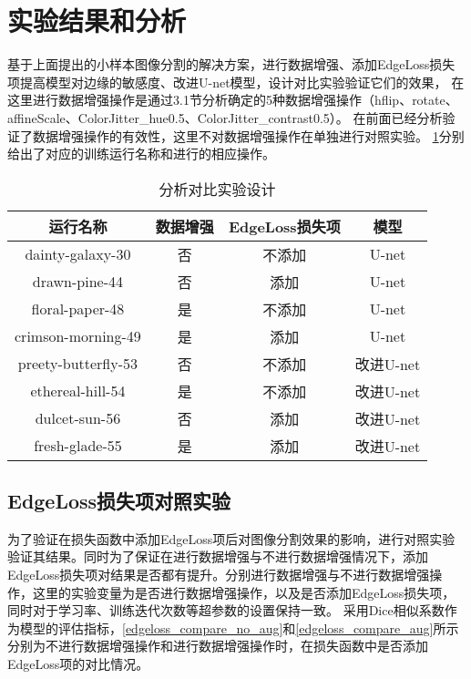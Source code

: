 \documentclass[AutoFakeBold]{LZUThesis}
\begin{document}
\section{实验结果和分析}
基于上面提出的小样本图像分割的解决方案，进行数据增强、添加EdgeLoss损失项提高模型对边缘的敏感度、改进U-net模型，设计对比实验验证它们的效果，
在这里进行数据增强操作是通过3.1节分析确定的5种数据增强操作（hflip、rotate、affineScale、ColorJitter\_hue0.5、ColorJitter\_contrast0.5）。
在前面已经分析验证了数据增强操作的有效性，这里不对数据增强操作在单独进行对照实验。
\cref{compare_experiment}分别给出了对应的训练运行名称和进行的相应操作。
\begin{table}[htbp] %
    \setlength{\abovecaptionskip}{0cm}
    \setlength{\belowcaptionskip}{0.2cm}
    \centering
    \caption{分析对比实验设计}
    \label{compare_experiment}
    \begin{tabular}{|c|c|c|c|}
        \hline
        运行名称            & 数据增强 & EdgeLoss损失项 & 模型      \\
        \hline
        dainty-galaxy-30    & 否       & 不添加         & U-net     \\
        \hline
        drawn-pine-44       & 否       & 添加           & U-net     \\
        \hline
        floral-paper-48     & 是       & 不添加         & U-net     \\
        \hline
        crimson-morning-49  & 是       & 添加           & U-net     \\
        \hline
        preety-butterfly-53 & 否       & 不添加         & 改进U-net \\
        \hline
        ethereal-hill-54    & 是       & 不添加         & 改进U-net \\
        \hline
        dulcet-sun-56       & 否       & 添加           & 改进U-net \\
        \hline
        fresh-glade-55      & 是       & 添加           & 改进U-net \\
        \hline
    \end{tabular}
\end{table}



\subsection{EdgeLoss损失项对照实验}


为了验证在损失函数中添加EdgeLoss项后对图像分割效果的影响，进行对照实验验证其结果。同时为了保证在进行数据增强与不进行数据增强情况下，添加EdgeLoss损失项对结果是否都有提升。分别进行数据增强与不进行数据增强操作，这里的实验变量为是否进行数据增强操作，以及是否添加EdgeLoss损失项，同时对于学习率、训练迭代次数等超参数的设置保持一致。
采用Dice相似系数作为模型的评估指标，\cref{edgeloss_compare_no_aug}和\cref{edgeloss_compare_aug}所示分别为不进行数据增强操作和进行数据增强操作时，在损失函数中是否添加EdgeLoss项的对比情况。
\end{document}
